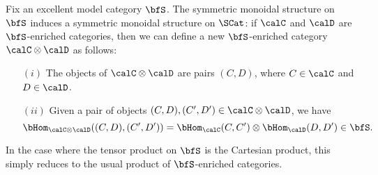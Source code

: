 \begin{Simplicial Categories}




Fix an excellent model category $\bfS$. The symmetric monoidal structure on $\bfS$
induces a symmetric monoidal structure on $\SCat$:
if $\calC$ and $\calD$ are $\bfS$-enriched categories, then we can define a new
$\bfS$-enriched category $\calC \otimes \calD$ as follows:
\begin{itemize}
\item[$(i)$] The objects of $\calC \otimes \calD$ are pairs $(C,D)$, where
$C \in \calC$ and $D \in \calD$.
\item[$(ii)$] Given a pair of objects $(C,D), (C',D') \in \calC \otimes \calD$, we have
$$ \bHom_{\calC \otimes \calD}( (C,D), (C',D')) = \bHom_{\calC}(C,C') \otimes \bHom_{\calD}(D,D') \in \bfS.$$
\end{itemize}
In the case where the tensor product on $\bfS$ is the Cartesian product, this simply
reduces to the usual product of $\bfS$-enriched categories.


\end{Simplicial Categories}
